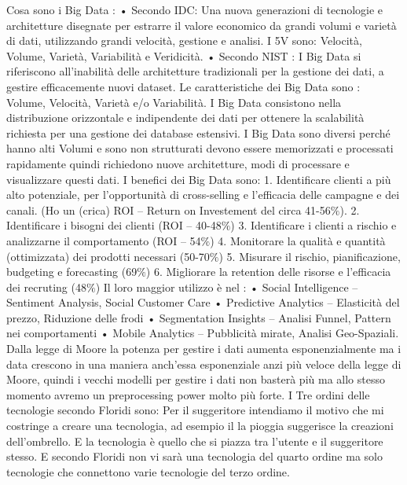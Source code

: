 \documentclass[11pt, a4page, twocolumn]{article}
\begin{document}
Cosa sono i Big Data : 
    • Secondo IDC: Una nuova generazioni di tecnologie e architetture disegnate per estrarre il valore economico da grandi volumi e varietà di dati, utilizzando grandi velocità, gestione e analisi. I 5V sono: Velocità, Volume, Varietà, Variabilità e Veridicità.
    • Secondo NIST : I Big Data si riferiscono all’inabilità delle architetture tradizionali per la gestione dei dati, a gestire efficacemente nuovi dataset. Le caratteristiche dei Big Data sono : Volume, Velocità, Varietà e/o Variabilità. I Big Data consistono nella distribuzione orizzontale e indipendente dei dati per ottenere la scalabilità richiesta per una gestione dei database estensivi. 
I Big Data sono diversi perché hanno alti Volumi e sono non strutturati devono essere memorizzati e processati rapidamente quindi richiedono nuove architetture, modi di processare e visualizzare questi dati.
I benefici dei Big Data sono:
    1. Identificare clienti a più alto potenziale, per l’opportunità di cross-selling e l’efficacia delle campagne e dei canali. (Ho un (crica) ROI – Return on Investement del circa 41-56$\%$).
    2. Identificare i bisogni dei clienti (ROI – 40-48$\%$)
    3. Identificare i clienti a rischio e analizzarne il comportamento (ROI – 54$\%$)
    4. Monitorare la qualità e quantità (ottimizzata) dei prodotti necessari (50-70$\%$)
    5. Misurare il rischio, pianificazione, budgeting e forecasting (69$\%$)
    6. Migliorare la retention delle risorse e l’efficacia dei recruting (48$\%$)
Il loro maggior utilizzo è nel : 
    • Social Intelligence – Sentiment Analysis, Social Customer Care
    • Predictive Analytics – Elasticità del prezzo, Riduzione delle frodi
    • Segmentation Insights – Analisi Funnel, Pattern nei comportamenti
    • Mobile Analytics – Pubblicità mirate, Analisi Geo-Spaziali.
Dalla legge di Moore la potenza per gestire i dati aumenta esponenzialmente ma i data crescono in una maniera anch’essa esponenziale anzi più veloce della legge di Moore, quindi i vecchi modelli per gestire i dati non basterà più ma allo stesso momento avremo un preprocessing power molto più forte.
I Tre ordini delle tecnologie secondo Floridi sono:
Per il suggeritore intendiamo il motivo che mi costringe a creare una tecnologia, ad esempio il la pioggia suggerisce la creazioni dell’ombrello. E la tecnologia è quello che si piazza tra l’utente e il suggeritore stesso. E secondo Floridi non vi sarà una tecnologia del quarto ordine ma solo tecnologie che connettono varie tecnologie del terzo ordine.  
\end{document}
